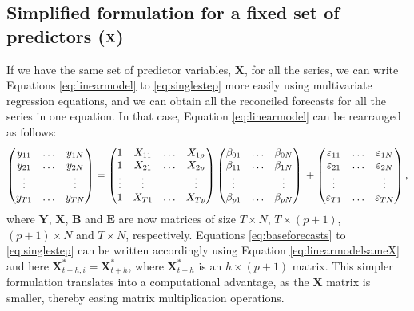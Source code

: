 \documentclass[11pt,a4paper,]{article}
\begin{document}
\hypertarget{simplified-formulation-for-a-fixed-set-of-predictors-bf-x}{%
\subsection{\texorpdfstring{Simplified formulation for a fixed set of predictors (\(\bf {X}\)) \label{sec:proposedapproach2}}{Simplified formulation for a fixed set of predictors (\textbackslash bf \{X\}) }}\label{simplified-formulation-for-a-fixed-set-of-predictors-bf-x}}

If we have the same set of predictor variables, \(\bm{X}\), for all the series, we can write Equations \eqref{eq:linearmodel} to \eqref{eq:singlestep} more easily using multivariate regression equations, and we can obtain all the reconciled forecasts for all the series in one equation. In that case, Equation \eqref{eq:linearmodel} can be rearranged as follows:
\begin{equation}\label{eq:linearmodelsameX}
  \begin{pmatrix}
  y_{11} & \dots & y_{1N}\\
  y_{21} & \dots & y_{2N}\\
  \vdots &       & \vdots\\
  y_{T1} & \dots & y_{TN}
  \end{pmatrix} =
  \begin{pmatrix}
  1      & X_{11} & \dots & X_{1p}\\
  1      & X_{21} & \dots & X_{2p}\\
  \vdots & \vdots &       & \vdots\\
  1      & X_{T1} & \dots & X_{Tp}
  \end{pmatrix}
  \begin{pmatrix}
  \beta_{01} & \dots & \beta_{0N}\\
  \beta_{11} & \dots & \beta_{1N}\\
  \vdots     &       & \vdots\\
  \beta_{p1} & \dots & \beta_{pN}
  \end{pmatrix} \\
  +
  \begin{pmatrix}
  \varepsilon_{11} & \dots & \varepsilon_{1N}\\
  \varepsilon_{21} & \dots & \varepsilon_{2N}\\
  \vdots           &       & \vdots\\
  \varepsilon_{T1} & \dots & \varepsilon_{TN}
  \end{pmatrix},
\end{equation}
where \(\bm{Y}\), \(\bm{X}\), \(\bm{B}\) and \(\bm{E}\) are now matrices of size \(T\times N\), \(T\times (p+1)\), \((p+1)\times N\) and \(T \times N\), respectively. Equations \eqref{eq:baseforecasts} to \eqref{eq:singlestep} can be written accordingly using Equation \eqref{eq:linearmodelsameX} and here \(\bm{X}^*_{t+h,i} = \bm{X}^*_{t+h}\), where \(\bm{X}^*_{t+h}\) is an \(h\times (p+1)\) matrix. This simpler formulation translates into a computational advantage, as the \(\bm X\) matrix is smaller, thereby easing matrix multiplication operations.
\end{document}
